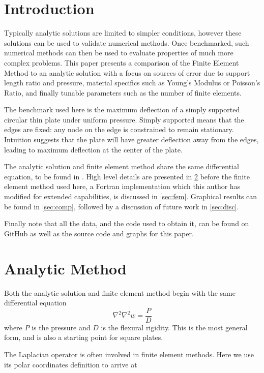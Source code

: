\documentclass[12pt,times,twocolumn,3p]{elsarticle}
\begin{document}

\section{Introduction} \label{intro}
Typically analytic solutions are limited to simpler conditions, however these
solutions can be used to validate numerical methods. Once benchmarked, such
numerical methods can then be used to evaluate properties of much more complex problems.
This paper presents a comparison of the Finite Element Method to an analytic
solution with a focus on sources of error due to support length ratio and
pressure, material specifics such as Young's Modulus or Poisson's
Ratio, and finally tunable parameters such as the number of finite elements.

The benchmark used here is the maximum deflection of a simply supported circular
thin plate under uniform pressure. Simply supported means that the edges are
fixed: any node on the edge is constrained to remain stationary. Intuition
suggests that the plate will have greater deflection away from the edges,
leading to maximum deflection at the center of the plate.

The analytic solution and finite element method share the same differential
equation, to be found in \cite{zien,boresi}. High level details are presented in
\cref{sec:ana} before the finite element method used here, a Fortran implementation
\cite{geocities} which this author has modified for extended capabilities, is
discussed in \cref{sec:fem}. Graphical results can be found in \cref{sec:comp},
followed by a discussion of future work in \cref{sec:disc}.

Finally note that all the data, and the code used to obtain it, can be found
on GitHub \cite{github} as well as the source code and graphs for this paper.

\section{Analytic Method} \label{sec:ana}
Both the analytic solution and finite element method begin with the same
differential equation
\begin{equation} \label{eqn:dp}
\nabla^2\nabla^2 w = \frac{P}{D}
\end{equation}
where $P$ is the pressure and $D$ is the flexural rigidity. This is the most
general form, and is also a starting point for square plates.


The Laplacian operator is often involved in finite element methods. Here we use
its polar coordinates definition to arrive at
\end{document}
